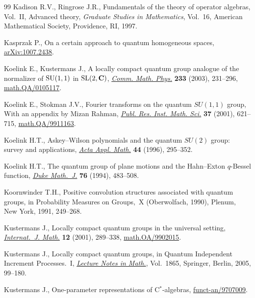\documentclass[pdftex]{sigma}
\numberwithin{equation}{section}
\theoremstyle{definition}
\begin{document}
\begin{thebibliography}{99}
 Kadison R.V., Ringrose J.R.,
  Fundamentals of the theory of operator algebras, Vol.~II, Advanced theory,
  {\it Graduate Studies in Mathematics}, Vol.~16, American Mathematical Society, Providence, RI, 1997.

 Kasprzak  P.,
On a certain approach to quantum homogeneous spaces,
\href{http://arxiv.org/abs/1007.2438}{arXiv:1007.2438}.


  Koelink E., Kustermans J.,
  A locally compact quantum group analogue of the normalizer of $\rm SU(1,1)$ in ${\rm SL}(2,\mathbf{C})$,
  \href{http://dx.doi.org/10.1007/s00220-002-0736-x}{\emph{Comm. Math. Phys.}}  {\bf 233}  (2003),  231--296,
\href{http://arxiv.org/abs/math.QA/0105117}{math.QA/0105117}.


  Koelink E., Stokman J.V.,
  Fourier transforms on the quantum $SU(1,1)$ group, With an appendix by Mizan Rahman,
   \href{http://dx.doi.org/10.2977/prims/1145477332}{\emph{Publ. Res. Inst. Math. Sci.}} {\bf 37}  (2001),  621--715,
\href{http://arxiv.org/abs/math.QA/9911163}{math.QA/9911163}.

Koelink  H.T.,
Askey--Wilson polynomials and the quantum $SU(2)$ group: survey and applications,
\href{http://dx.doi.org/10.1007/BF00047396}{\emph{Acta Appl. Math.}} {\bf 44} (1996), 295--352.

 Koelink  H.T.,
  The quantum group of plane motions and the Hahn--Exton $q$-Bessel function,
  \href{http://dx.doi.org/10.1215/S0012-7094-94-07617-5}{\emph{Duke Math.~J.}} {\bf 76} (1994), 483--508.

  Koornwinder T.H.,
Positive convolution structures associated with quantum groups,
 in Probability Measures on Groups,~X (Oberwolfach, 1990), Plenum, New York, 1991, 249--268.

  Kustermans  J.,
    Locally compact quantum groups in the universal setting,
\href{http://dx.doi.org/10.1142/S0129167X01000757}{\emph{Internat.~J. Math.}} {\bf 12} (2001), 289--338,
\href{http://arxiv.org/abs/math.OA/9902015}{math.OA/9902015}.


 Kustermans  J.,
  Locally compact quantum groups,
in Quantum Independent Increment Processes.~I,
\href{http://dx.doi.org/10.1007/11376569_2}{{\it Lecture Notes in Math.}}, Vol.~1865, Springer, Berlin, 2005, 99--180.

 Kustermans J.,
  One-parameter representations of C$^\ast$-algebras,
\href{http://arxiv.org/abs/funct-an/9707009}{funct-an/9707009}.


\end{thebibliography}
\end{document}
